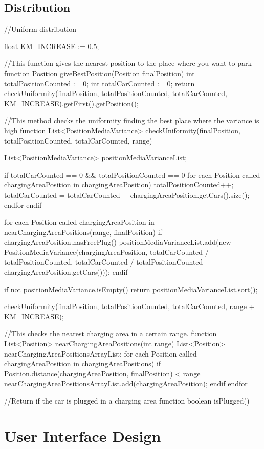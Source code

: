 \documentclass[11pt,a4paper]{report}
\begin{document}
\section{Distribution }
\begin{pseudocodeEnv}
//Uniform distribution	

float KM_INCREASE := 0.5;
	
//This function gives the nearest position to the place where you want to park
function Position giveBestPosition(Position finalPosition){
	int totalPositionCounted := 0;
	int totalCarCounted := 0;
	return checkUniformity(finalPosition, totalPositionCounted, totalCarCounted, KM_INCREASE).getFirst().getPosition();
}
	
//This method checks the uniformity finding the best place where the variance is high
function List<PositionMediaVariance> checkUniformity(finalPosition, totalPositionCounted, totalCarCounted, range){
	List<PositionMediaVariance> positionMediaVarianceList;
	
	if totalCarCounted == 0 && totalPositionCounted == 0
		for each Position called chargingAreaPosition in chargingAreaPosition)
			totalPositionCounted++;
			totalCarCounted = totalCarCounted + chargingAreaPosition.getCars().size();
		endfor
	endif
	
	for each Position called chargingAreaPosition in nearChargingAreaPositions(range, finalPosition){
		if chargingAreaPosition.hasFreePlug()
			positionMediaVarianceList.add(new PositionMediaVariance(chargingAreaPosition, totalCarCounted / totalPositionCounted, totalCarCounted / totalPositionCounted - chargingAreaPosition.getCars()));
		endif
	}
		
	if not positionMediaVariance.isEmpty(){
		return positionMediaVarianceList.sort();
	}
	
	checkUniformity(finalPosition, totalPositionCounted, totalCarCounted, range + KM_INCREASE);
}

//This checks the nearest charging area in a certain range.
function List<Position> nearChargingAreaPositions(int range){
	List<Position> nearChargingAreaPositionsArrayList;
	for each Position called chargingAreaPosition in chargingAreaPositions)
		if Position.distance(chargingAreaPosition, finalPosition) < range
			nearChargingAreaPositionsArrayList.add(chargingAreaPosition);
		endif
	endfor
}

//Return if the car is plugged in a charging area
function boolean isPlugged()
\end{pseudocodeEnv}
\chapter{User Interface Design}
\end{document}
